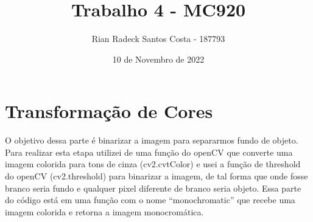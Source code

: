 \documentclass[12pt, letterpaper]{article}
\title{Trabalho 4 - MC920}
\author{Rian Radeck Santos Costa - 187793}
\date{10 de Novembro de 2022}
\begin{document}
\maketitle
\newpage
\tableofcontents
\newpage

\section{Transformação de Cores}
    O objetivo dessa parte é binarizar a imagem para separarmos fundo de objeto. Para realizar esta etapa utilizei de uma função do openCV que converte uma imagem colorida para tons de cinza (cv2.cvtColor) e usei a função de threshold do openCV (cv2.threshold) para binarizar a imagem, de tal forma que onde fosse branco seria fundo e qualquer pixel diferente de branco seria objeto. Essa parte do código está em uma função com o nome ``monochromatic'' que recebe uma imagem colorida e retorna a imagem monocromática.
\end{document}
